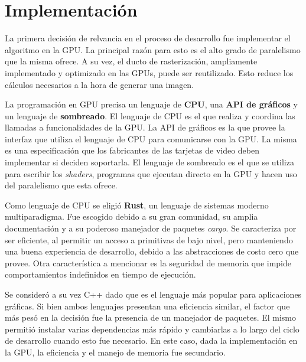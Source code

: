 \graphicspath{{chapters/4_implementación/figures}}

\chapter{Implementación}\label{chap:implementation}

La primera decisión de relvancia en el proceso de desarrollo fue implementar el algoritmo en la GPU.
La principal razón para esto es el alto grado de paralelismo que la misma ofrece.
A su vez, el ducto de rasterización, ampliamente implementado y optimizado en las GPUs, puede ser reutilizado.
Esto reduce los cálculos necesarios a la hora de generar una imagen.  

La programación en GPU precisa un lenguaje de \textbf{CPU}, una \textbf{API de gráficos} y un lenguaje de \textbf{sombreado}.
El lenguaje de CPU es el que realiza y coordina las llamadas a funcionalidades de la GPU.
La API de gráficos es la que provee la interfaz que utiliza el lenguaje de CPU para comunicarse con la GPU.
La misma es una especificación que los fabricantes de las tarjetas de video deben implementar si deciden soportarla.
El lenguaje de sombreado es el que se utiliza para escribir los \textit{shaders}, programas que ejecutan directo en la GPU y hacen uso del paralelismo que esta ofrece.

Como lenguaje de CPU se eligió \textbf{Rust}, un lenguaje de sistemas moderno multiparadigma.
Fue escogido debido a su gran comunidad, su amplia documentación y a su poderoso manejador de paquetes \textit{cargo}.  
Se caracteriza por ser eficiente, al permitir un acceso a primitivas de bajo nivel, pero manteniendo una buena experiencia de desarrollo, debido a las abstracciones de costo cero que provee.
Otra característica a mencionar es la seguridad de memoria que impide comportamientos indefinidos en tiempo de ejecución.

Se consideró a su vez C++ dado que es el lenguaje más popular para aplicaciones gráficas.  
Si bien ambos lenguajes presentan una eficiencia similar, el factor que más pesó en la decisión fue la presencia de un manejador de paquetes.
El mismo permitió instalar varias dependencias más rápido y cambiarlas a lo largo del ciclo de desarrollo cuando esto fue necesario.
En este caso, dada la implementación en la GPU, la eficiencia y el manejo de memoria fue secundario. 

